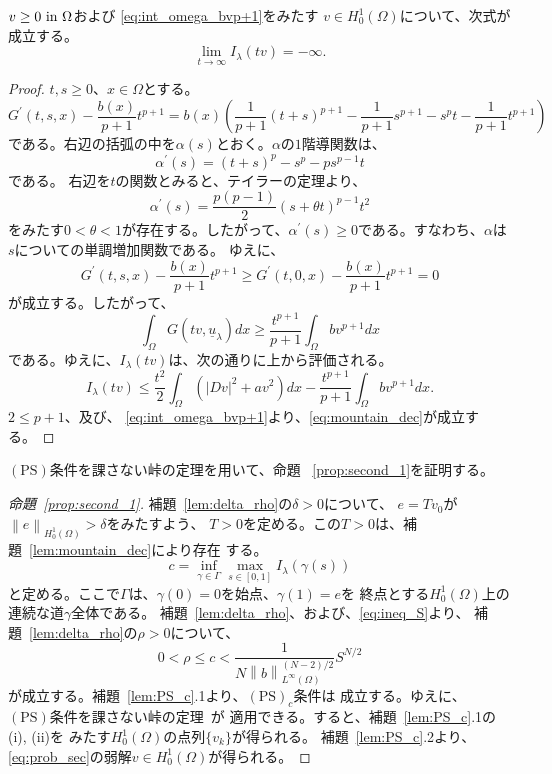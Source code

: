 \begin{lem} \label{lem:mountain_dec}
 $v \geq 0 ~\text{in}~ \Omega$および
 \eqref{eq:int_omega_bvp+1}をみたす
 $v \in H_0^1(\Omega)$について、次式が成立する。
 \begin{equation}
  \lim_{t \to \infty} I_\lambda(tv) =  -\infty. \label{eq:mountain_dec}
 \end{equation}
\end{lem}

\begin{proof}
 $t, s \geq 0$、$x \in \Omega$とする。
 \[
  G^\prime(t, s, x) - \frac{b(x)}{p+1} t^{p+1} = b(x) \left(
 \frac{1}{p+1}(t+s)^{p+1} - \frac{1}{p+1} s^{p+1} - s^p t -
 \frac{1}{p+1} t^{p+1} \right)
 \]
 である。右辺の括弧の中を$\alpha(s)$とおく。$\alpha$の$1$階導関数は、
 \[
  \alpha^\prime(s) = (t+s)^p - s^p - p s^{p-1} t
 \]
 である。
 右辺を$t$の関数とみると、テイラーの定理より、
 \[
  \alpha^\prime(s) = \frac{p(p-1)}{2}(s+ \theta t)^{p-1} t^2
 \]
 をみたす$0 < \theta < 1$が存在する。したがって、$\alpha^\prime(s)
 \geq 0$である。すなわち、$\alpha$は$s$についての単調増加関数である。
 ゆえに、
 \[
 G^\prime(t, s, x) - \frac{b(x)}{p+1} t^{p+1} \geq 
 G^\prime(t, 0, x) - \frac{b(x)}{p+1} t^{p+1} = 0
 \]
 が成立する。したがって、
 \[
  \int_\Omega G(tv, \underline{u}_\lambda) dx \geq
 \frac{t^{p+1}}{p+1} \int_\Omega b v^{p+1} dx
 \]
 である。ゆえに、$I_\lambda(tv)$は、次の通りに上から評価される。
 \[
  I_\lambda(tv) \leq \frac{t^2}{2} \int_\Omega \left( \lvert Dv
 \rvert^2 + av^2 \right) dx - \frac{t^{p+1}}{p+1} \int_\Omega bv^{p+1} dx.
 \]
 $2 \leq p+1$、及び、
 \eqref{eq:int_omega_bvp+1}より、\eqref{eq:mountain_dec}が成立する。\qedhere
\end{proof}

$(\mathrm{PS})$条件を課さない峠の定理を用いて、命題
~\ref{prop:second_1}を証明する。

\begin{proof}[命題~\ref{prop:second_1}]
 補題~\ref{lem:delta_rho}の$\delta > 0$について、
 $e = Tv_0$が$\left\| e \right\|_{H_0^1(\Omega)} > \delta$をみたすよう、
 $T > 0$を定める。この$T > 0$は、補題~\ref{lem:mountain_dec}により存在
 する。
 \[
   c = \inf_{\gamma \in \Gamma} \max_{s \in [0, 1]} I_\lambda ( \gamma
 (s ))
 \]
 と定める。ここで$\Gamma$は、$\gamma(0) = 0$を始点、$\gamma(1) = e$を
 終点とする$H_0^1(\Omega)$上の連続な道$\gamma$全体である。
 補題~\ref{lem:delta_rho}、および、\eqref{eq:ineq_S}より、
 補題~\ref{lem:delta_rho}の$\rho > 0$について、
 \[
  0 < \rho \leq c <    \frac{1}{N\left\| b
             \right\|_{L^\infty(\Omega)} ^{(N-2)/2}} S^{N/2} 
 \]
 が成立する。補題~\ref{lem:PS_c}.1より、$(\mathrm{PS})_c$条件は
 成立する。ゆえに、
 $(\mathrm{PS})$条件を課さない峠の定理~\cite{MR0370183}が
 適用できる。すると、補題~\ref{lem:PS_c}.1の(i), (ii)を
 みたす$H_0^1(\Omega)$の点列$\{ v_k \}$が得られる。
 補題~\ref{lem:PS_c}.2より、\ref{eq:prob_sec}の弱解$v \in
 H_0^1(\Omega)$が得られる。\qedhere
\end{proof}

